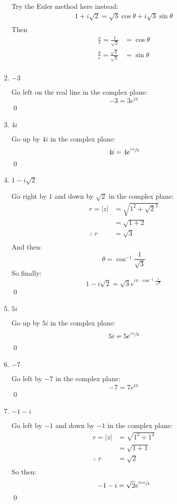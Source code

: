 \begin{enumerate}
\begin{enumerate}
		Try the Euler method here instead:
		\begin{align*}
			1 + i\sqrt{2} = \sqrt{3}\cos\theta + i\sqrt{3}\sin\theta \\
		\end{align*}
		Then
		\begin{align*}
			\frac{x}{r} = \frac{1}{\sqrt{3}} &= \cos\theta \\
			\frac{y}{r} = \frac{\sqrt{2}}{\sqrt{3}} &= \sin\theta \\
		\end{align*}
		
		\item $-3$
	
		Go left on the real line in the complex plane:
		\[-3 = 3e^{i\pi} \]
		\qed
		
		\item $4i$
	
		Go up by $4i$ in the complex plane:
		\[4i = 4e^{\sfrac{i\pi}{2}} \]
		\qed
		
		\item $1 -i\sqrt{2}$

		Go right by $1$ and down by $\sqrt{2}$ in the complex plane:
		\begin{align*}
		r = |z| &= \sqrt{1^2 + \sqrt{2}^2} \\
		&= \sqrt{1 + 2} \\
		\therefore \; r &= \sqrt{3}\\
		\end{align*}
		And then:
		\[ \theta = \cos^{-1}{\frac{1}{\sqrt{3}}} \]
		So finally:
		\[ 1 -i\sqrt{2} = \sqrt{3}e^{i\pi\cdot \cos^{-1}{\frac{1}{\sqrt{3}}} } \]
		\qed
		

		\item $5i$

		Go up by $5i$ in the complex plane:
		\[ 5i = 5e^{\sfrac{i\pi}{2}} \]
		\qed
		
		\item $-7$

		Go left by $-7$ in the complex plane:
		\[-7 = 7e^{i\pi} \]
		\qed
		 
		\item $-1 - i$

		Go left by $-1$ and down by $-1$ in the complex plane:
		\begin{align*}
		r = |z| &= \sqrt{1^2 + 1^2} \\
		&= \sqrt{1 + 1} \\
		\therefore \; r &= \sqrt{2}\\
		\end{align*}
		So then:
		\[ -1 - i = \sqrt{2}e^{\sfrac{5i\pi}{4}} \]
		\qed
	\end{enumerate}
	

\end{enumerate}
